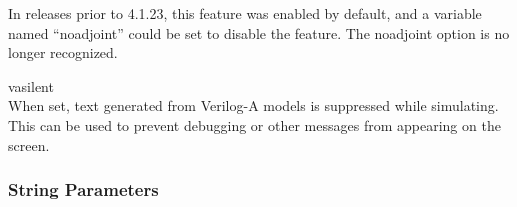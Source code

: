 \begin{description}
In {\WRspice} releases prior to 4.1.23, this feature was enabled by
default, and a variable named ``{\et noadjoint}'' could be set to
disable the feature.  The {\et noadjoint} option is no longer
recognized.

\item{\et vasilent}\\

When set, text generated from Verilog-A models is suppressed while
simulating.  This can be used to prevent debugging or other messages
from appearing on the screen.
\end{description}

\subsubsection{String Parameters}


